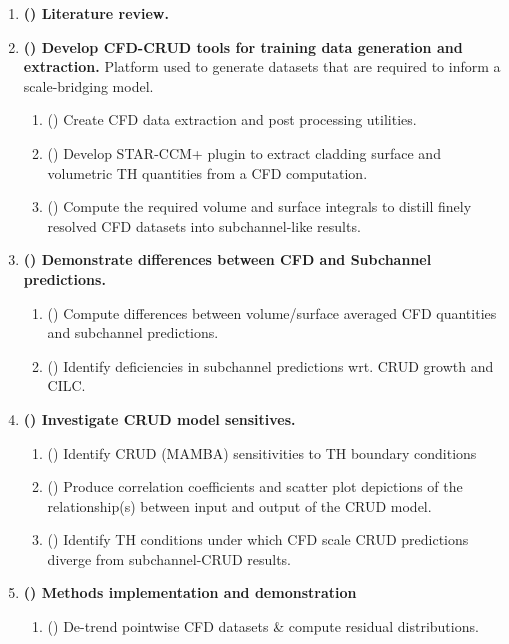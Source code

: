 \begin{enumerate}
\item \textbf{(\checkmark) Literature review.}
\item \textbf{(\checkmark) Develop CFD-CRUD tools for training data generation and extraction.}
          Platform used to generate datasets that are
          required to inform a scale-bridging model.
    \begin{enumerate}
        \item (\checkmark) Create CFD data extraction and post processing utilities.
        \item (\checkmark) Develop STAR-CCM+ plugin to extract cladding surface and volumetric TH quantities from a CFD computation.
        \item (\checkmark) Compute the required volume and surface integrals to
              distill finely resolved CFD datasets into subchannel-like results.
    \end{enumerate}
\item \textbf{(\checkmark) Demonstrate differences between CFD and Subchannel predictions.}
    \begin{enumerate}
        \item (\checkmark) Compute differences between volume/surface averaged CFD quantities and subchannel predictions.
        \item (\checkmark) Identify deficiencies in subchannel predictions wrt. CRUD growth and CILC.
    \end{enumerate}
\item \textbf{(\checkmark) Investigate CRUD model sensitives.}
    \begin{enumerate}
        \item (\checkmark) Identify CRUD (MAMBA) sensitivities to TH boundary conditions
        \item (\checkmark) Produce correlation coefficients and scatter plot depictions of the relationship(s) between input
              and output of the CRUD model.
          \item (\checkmark) Identify TH conditions under which CFD scale CRUD predictions diverge from subchannel-CRUD results.
    \end{enumerate}
%
\item \textbf{(\checkmark) Methods implementation and demonstration}
    \begin{enumerate}
        \item (\checkmark) De-trend pointwise CFD datasets \& compute residual distributions.

\end{enumerate}
\end{enumerate}
